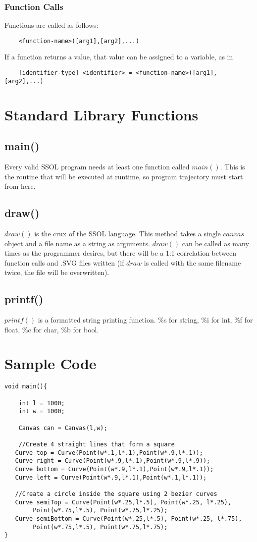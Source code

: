 \documentclass{article}
\begin{document}
\subsubsection{Function Calls}
Functions are called as follows:
\begin{verbatim}
    <function-name>([arg1],[arg2],...)
\end{verbatim}

If a function returns a value, that value can be assigned to a variable, as in
\begin{verbatim}
    [identifier-type] <identifier> = <function-name>([arg1],[arg2],...)
\end{verbatim}

\section{Standard Library Functions}
\subsection{main()}
Every valid SSOL program needs at least one function called $main()$. This is the routine that will be executed at runtime, so program trajectory must start from here.
\subsection{draw()}
$draw()$ is the crux of the SSOL language. This method takes a single $canvas$ object and a file name as a string as arguments. $draw()$ can be called as many times as the programmer desires, but there will be a 1:1 correlation between function calls and .SVG files written (if $draw$ is called with the same filename twice, the file will be overwritten).
\subsection{printf()}
$printf()$ is a formatted string printing function. \%s for string, \%i for int, \%f for float, \%c for char, \%b for bool.

\section{Sample Code}



\begin{verbatim}
void main(){
    
    int l = 1000;
    int w = 1000;
    
    Canvas can = Canvas(l,w);
    
    //Create 4 straight lines that form a square
   Curve top = Curve(Point(w*.1,l*.1),Point(w*.9,l*.1));
   Curve right = Curve(Point(w*.9,l*.1),Point(w*.9,l*.9));
   Curve bottom = Curve(Point(w*.9,l*.1),Point(w*.9,l*.1));
   Curve left = Curve(Point(w*.9,l*.1),Point(w*.1,l*.1));
   
   //Create a circle inside the square using 2 bezier curves
   Curve semiTop = Curve(Point(w*.25,l*.5), Point(w*.25, l*.25),
        Point(w*.75,l*.5), Point(w*.75,l*.25);
   Curve semiBottom = Curve(Point(w*.25,l*.5), Point(w*.25, l*.75),
        Point(w*.75,l*.5), Point(w*.75,l*.75);
}
\end{verbatim}
\end{document}
